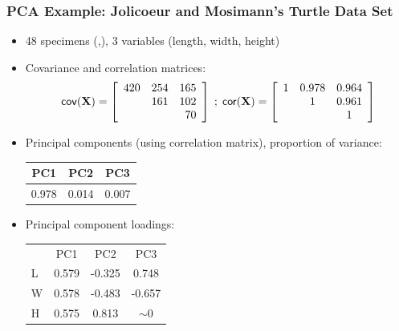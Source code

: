 \documentclass{beamer}
\begin{document}

\begin{frame}
  \frametitle{PCA Example: Jolicoeur and Mosimann's Turtle Data Set}

\begin{itemize}
\item 48 specimens (\Male,\Female), 3 variables (length, width, height)

\item Covariance and correlation matrices:
\footnotesize{
\[
\mathsf{cov}(\mathbf{X}) = \left[ \begin{array}{rrr}
420 & 254 & 165 \\
       & 161 & 102 \\
       &        &   70\\
\end{array}
\right]
\;
;
\;
\mathsf{cor}(\mathbf{X}) = \left[ \begin{array}{ccc}
1 & 0.978 & 0.964 \\
       & 1 & 0.961\\
       &        &   1\\
\end{array}
\right]
\]
} %

\item Principal components (using correlation matrix), proportion of variance:

{\small
\begin{center}
\begin{tabular}{ccc}
PC1 & PC2 & PC3 \\ \hline
0.978 & 0.014 & 0.007
\end{tabular}
\end{center}
} %

\item Principal component loadings:

{\small
\begin{center}
\begin{tabular}{lccc}
&PC1 & PC2 & PC3 \\ \cline{2-4}
L & 0.579 & -0.325 & 0.748 \\
W & 0.578 & -0.483 & -0.657 \\
H & 0.575 & 0.813 & $\sim$0 \\
\end{tabular}
\end{center}
} %



\end{itemize}


\end{frame}
\end{document}
